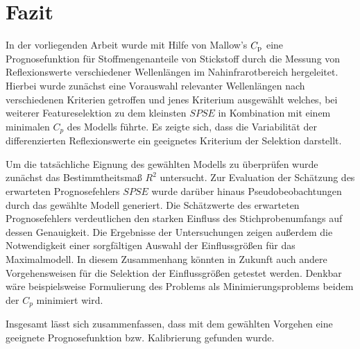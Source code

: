 \section{Fazit}
\label{sec:Fazit}

    In der vorliegenden Arbeit wurde mit Hilfe von Mallow's $C_{\mathrm{p}}$ eine Prognosefunktion für Stoffmengenanteile von Stickstoff durch die Messung von Reflexionswerte verschiedener Wellenlängen im Nahinfrarotbereich hergeleitet.
    Hierbei wurde zunächst eine Vorauswahl relevanter Wellenlängen nach verschiedenen Kriterien getroffen und jenes Kriterium ausgewählt welches, bei weiterer Featureselektion zu dem kleinsten $SPSE$ in Kombination mit einem minimalen $C_{p}$ des Modells führte.
    Es zeigte sich, dass die Variabilität der differenzierten Reflexionswerte ein geeignetes Kriterium der Selektion darstellt.
    
    Um die tatsächliche Eignung des gewählten Modells zu überprüfen wurde zunächst das Bestimmtheitsmaß $R^2$ untersucht.
    Zur Evaluation der Schätzung des erwarteten Prognosefehlers $SPSE$ wurde darüber hinaus Pseudobeobachtungen durch das gewählte Modell generiert.
    Die Schätzwerte des erwarteten Prognosefehlers verdeutlichen den starken Einfluss des Stichprobenumfangs auf dessen Genauigkeit.
    Die Ergebnisse der Untersuchungen zeigen außerdem die Notwendigkeit einer sorgfältigen Auswahl der Einflussgrößen für das Maximalmodell.
    In diesem Zusammenhang könnten in Zukunft auch andere Vorgehensweisen für die Selektion der Einflussgrößen getestet werden.
    Denkbar wäre beispielsweise Formulierung des Problems als Minimierungsproblems beidem der $C_p$ minimiert wird.\cite{Menzel2016}
    
    Insgesamt lässt sich zusammenfassen, dass mit dem gewählten Vorgehen eine geeignete Prognosefunktion bzw. Kalibrierung gefunden wurde.
    
